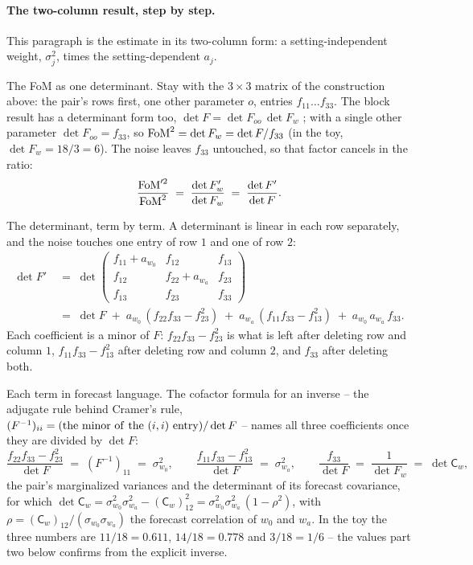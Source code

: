 \documentclass[11pt]{article}
\newcommand{\Cov}{\mathsf{C}}
\begin{document}
\paragraph{The two-column result, step by step.}
This paragraph is the estimate in its two-column form: a
setting-independent weight, $\sigma_j^2$, times the
setting-dependent $a_j$.

The FoM as one determinant.  Stay with the $3 \times 3$ matrix of
the construction above: the pair's rows first, one other parameter
$o$, entries $f_{11} \dots f_{33}$.  The block result has a
determinant form too, $\det F = \det F_{oo}\,\det F_w$
\cite{Petersen2012}; with a single other parameter
$\det F_{oo} = f_{33}$, so
${\rm FoM}^2 = \det F_w = \det F/f_{33}$ (in the toy,
$\det F_w = 18/3 = 6$).  The noise leaves $f_{33}$ untouched, so
that factor cancels in the ratio:
\begin{equation*}
  \frac{{\rm FoM}'^2}{{\rm FoM}^2}
  \;=\; \frac{\det F'_w}{\det F_w}
  \;=\; \frac{\det F'}{\det F} .
\end{equation*}

The determinant, term by term.  A determinant is linear in each row
separately, and the noise touches one entry of row $1$ and one of
row $2$:
\begin{align*}
  \det F' \;&=\;
  \det\begin{pmatrix}
    f_{11} + a_{w_0} & f_{12} & f_{13} \\
    f_{12} & f_{22} + a_{w_a} & f_{23} \\
    f_{13} & f_{23} & f_{33}
  \end{pmatrix} \\
  &=\; \det F
  \;+\; a_{w_0}\,(f_{22}f_{33} - f_{23}^2)
  \;+\; a_{w_a}\,(f_{11}f_{33} - f_{13}^2)
  \;+\; a_{w_0}\,a_{w_a}\,f_{33} .
\end{align*}
Each coefficient is a minor of $F$: $f_{22}f_{33} - f_{23}^2$ is
what is left after deleting row and column $1$,
$f_{11}f_{33} - f_{13}^2$ after deleting row and column $2$, and
$f_{33}$ after deleting both.

Each term in forecast language.  The cofactor formula for an
inverse -- the adjugate rule behind Cramer's rule,
$(F^{-1})_{ii} = ({\rm the\ minor\ of\ the\ }(i,i){\rm\ entry})/
\det F$ -- names all three coefficients once they are divided by
$\det F$:
\begin{equation*}
  \frac{f_{22}f_{33} - f_{23}^2}{\det F} \;=\; (F^{-1})_{11}
  \;=\; \sigma_{w_0}^2 ,
  \qquad
  \frac{f_{11}f_{33} - f_{13}^2}{\det F} \;=\; \sigma_{w_a}^2 ,
  \qquad
  \frac{f_{33}}{\det F} \;=\; \frac{1}{\det F_w} \;=\; \det\Cov_w ,
\end{equation*}
the pair's marginalized variances and the determinant of its
forecast covariance, for which
$\det\Cov_w = \sigma_{w_0}^2\sigma_{w_a}^2 - (\Cov_w)_{12}^2 =
\sigma_{w_0}^2\sigma_{w_a}^2\,(1 - \rho^2)$, with
$\rho = (\Cov_w)_{12}/(\sigma_{w_0}\sigma_{w_a})$ the forecast
correlation of $w_0$ and $w_a$.  In the toy the three numbers are
$11/18 = 0.611$, $14/18 = 0.778$ and $3/18 = 1/6$ -- the values
part two below confirms from the explicit inverse.
\end{document}
